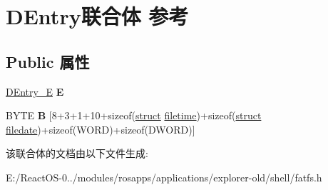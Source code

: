 \hypertarget{union_d_entry}{}\section{D\+Entry联合体 参考}
\label{union_d_entry}
\subsection*{Public 属性}
\begin{DoxyCompactItemize}
\item 
\mbox{\label{union_d_entry_ad0847253ce12ed6609f7fbe75dfc4726}} 
\hyperlink{struct_d_entry___e}{D\+Entry\+\_\+E} {\bfseries E}
\item 
\mbox{\label{union_d_entry_a6ab8cd189eebb975496f193336df5ac3}} 
B\+Y\+TE {\bfseries B} \mbox{[}8+3+1+10+sizeof(\hyperlink{interfacestruct}{struct} \hyperlink{structfiletime}{filetime})+sizeof(\hyperlink{interfacestruct}{struct} \hyperlink{structfiledate}{filedate})+sizeof(W\+O\+RD)+sizeof(D\+W\+O\+RD)\mbox{]}
\end{DoxyCompactItemize}


该联合体的文档由以下文件生成\+:\begin{DoxyCompactItemize}
\item 
E\+:/\+React\+O\+S-\/0../modules/rosapps/applications/explorer-\/old/shell/fatfs.\+h\end{DoxyCompactItemize}
